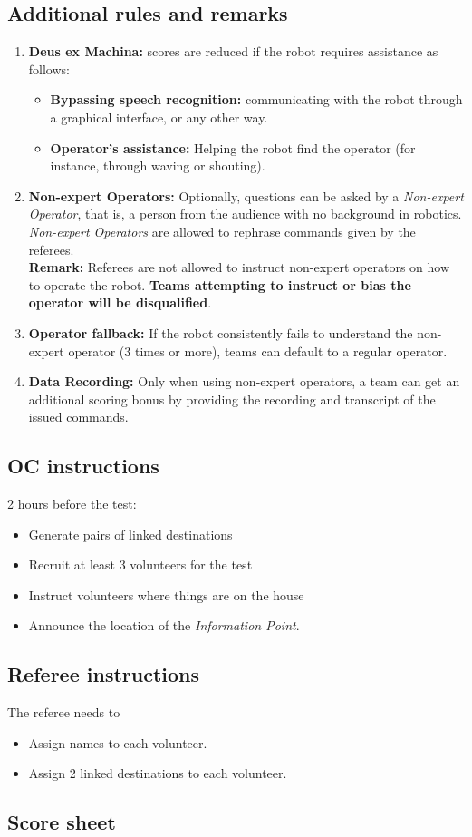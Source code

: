 \subsection*{Additional rules and remarks}
\begin{enumerate}[nosep]
	\item \textbf{Deus ex Machina:} scores are reduced if the robot requires assistance as follows:
	\begin{itemize}[nosep]
		\item \textbf{Bypassing speech recognition:} communicating with the robot through a graphical interface, or any other way.
		
		\item \textbf{Operator's assistance:} Helping the robot find the operator (for instance, through waving or shouting).
	\end{itemize}

	\item \textbf{Non-expert Operators:} Optionally, questions can be asked by a \emph{Non-expert Operator}, that is, a person from the audience with no background in robotics. \emph{Non-expert Operators} are allowed to rephrase commands given by the referees.
	\\\textbf{Remark:} Referees are not allowed to instruct non-expert operators on how to operate the robot. \textbf{Teams attempting to instruct or bias the operator will be disqualified}.

	\item \textbf{Operator fallback:} If the robot consistently fails to understand the non-expert operator (3 times or more), teams can default to a regular operator.
	
	\item \textbf{Data Recording:} Only when using non-expert operators, a team can get an additional scoring bonus by providing the recording and transcript of the issued commands.

\end{enumerate}

\subsection*{OC instructions}
2 hours before the test:
\begin{itemize}
	\item Generate pairs of linked destinations
	\item Recruit at least 3 volunteers for the test
	\item Instruct volunteers where things are on the house
	\item Announce the location of the \emph{Information Point}.
\end{itemize}

\subsection*{Referee instructions}
The referee needs to
\begin{itemize}
	\item Assign names to each volunteer.
	\item Assign 2 linked destinations to each volunteer.
\end{itemize}

\subsection*{Score sheet}

